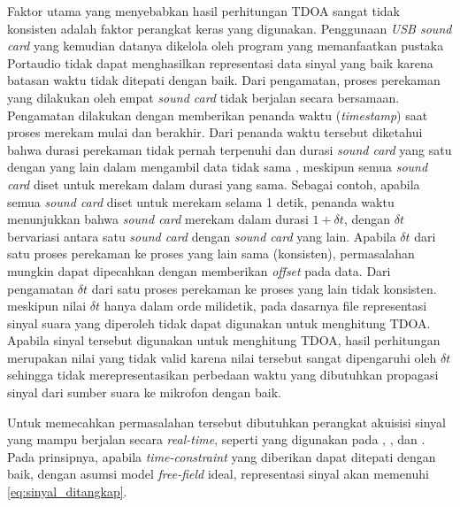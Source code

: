 Faktor utama yang menyebabkan hasil perhitungan TDOA sangat tidak konsisten adalah faktor perangkat keras yang digunakan. Penggunaan \textit{USB sound card} yang kemudian datanya dikelola oleh program yang memanfaatkan pustaka Portaudio tidak dapat menghasilkan representasi data sinyal yang baik karena batasan waktu tidak ditepati dengan baik. Dari pengamatan, proses perekaman yang dilakukan oleh empat \textit{sound card} tidak berjalan secara bersamaan. Pengamatan dilakukan dengan memberikan penanda waktu (\textit{timestamp}) saat proses merekam mulai dan berakhir. Dari penanda waktu tersebut diketahui bahwa durasi perekaman tidak pernah terpenuhi dan durasi \textit{sound card} yang satu dengan yang lain dalam mengambil data tidak sama , meskipun semua \textit{sound card} diset untuk merekam dalam durasi yang sama. Sebagai contoh, apabila semua \textit{sound card} diset untuk merekam selama 1 detik, penanda waktu menunjukkan bahwa \textit{sound card} merekam dalam durasi $1 + \delta t$, dengan $\delta t$ bervariasi antara satu \textit{sound card} dengan \textit{sound card} yang lain. Apabila  $\delta t$ dari satu proses perekaman ke proses yang lain sama (konsisten), permasalahan mungkin dapat dipecahkan dengan memberikan \textit{offset} pada data. Dari pengamatan $\delta t$ dari satu proses perekaman ke proses yang lain tidak konsisten. meskipun nilai $\delta t$ hanya dalam orde milidetik, pada dasarnya file representasi sinyal suara yang diperoleh tidak dapat digunakan untuk menghitung TDOA. Apabila sinyal tersebut digunakan untuk menghitung TDOA, hasil perhitungan merupakan nilai yang tidak valid karena nilai tersebut sangat dipengaruhi oleh $\delta t$ sehingga tidak merepresentasikan perbedaan waktu yang dibutuhkan propagasi sinyal dari sumber suara ke mikrofon dengan baik.

Untuk memecahkan permasalahan tersebut dibutuhkan perangkat akuisisi sinyal yang mampu berjalan secara \textit{real-time}, seperti yang digunakan pada \cite{lee2005}, \cite{nakano2010}, dan \cite{park2009}. Pada prinsipnya, apabila \textit{time-constraint} yang diberikan dapat ditepati dengan baik, dengan asumsi model \textit{free-field} ideal, representasi sinyal akan memenuhi \autoref{eq:sinyal_ditangkap}.
